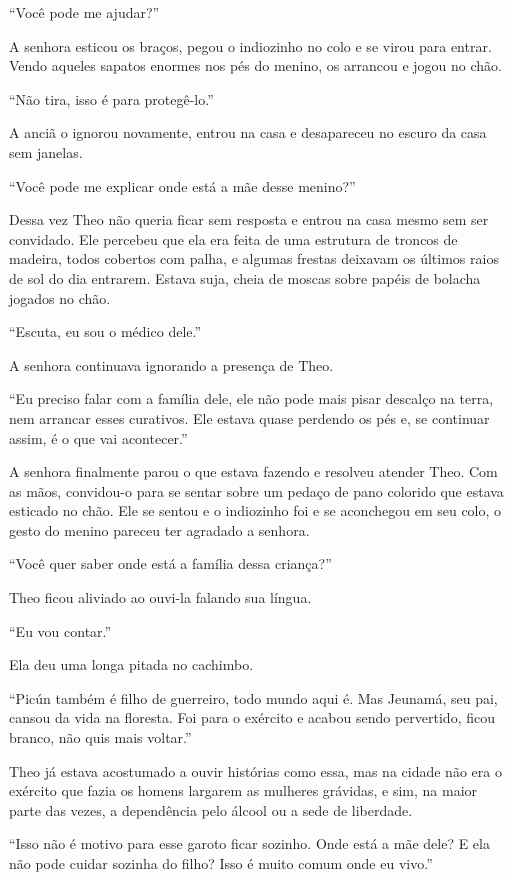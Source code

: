 ``Você pode me ajudar?''

A senhora esticou os braços, pegou o indiozinho no colo e se virou para
entrar. Vendo aqueles sapatos enormes nos pés do menino, os arrancou e
jogou no chão.

``Não tira, isso é para protegê-lo.''

A anciã o ignorou novamente, entrou na casa e desapareceu no escuro da
casa sem janelas.

``Você pode me explicar onde está a mãe desse menino?''

Dessa vez Theo não queria ficar sem resposta e entrou na casa mesmo sem
ser convidado. Ele percebeu que ela era feita de uma estrutura de
troncos de madeira, todos cobertos com palha, e algumas frestas deixavam
os últimos raios de sol do dia entrarem. Estava suja, cheia de moscas
sobre papéis de bolacha jogados no chão.

``Escuta, eu sou o médico dele.''

A senhora continuava ignorando a presença de Theo.

``Eu preciso falar com a família dele, ele não pode mais pisar descalço
na terra, nem arrancar esses curativos. Ele estava quase perdendo os pés
e, se continuar assim, é o que vai acontecer.''

A senhora finalmente parou o que estava fazendo e resolveu atender Theo.
Com as mãos, convidou-o para se sentar sobre um pedaço de pano colorido
que estava esticado no chão. Ele se sentou e o indiozinho foi e se
aconchegou em seu colo, o gesto do menino pareceu ter agradado a
senhora.

``Você quer saber onde está a família dessa criança?''

Theo ficou aliviado ao ouvi-la falando sua língua.

``Eu vou contar.''

Ela deu uma longa pitada no cachimbo.

``Picún também é filho de guerreiro, todo mundo aqui é. Mas Jeunamá, seu
pai, cansou da vida na floresta. Foi para o exército e acabou sendo
pervertido, ficou branco, não quis mais voltar.''

Theo já estava acostumado a ouvir histórias como essa, mas na cidade não
era o exército que fazia os homens largarem as mulheres grávidas, e sim,
na maior parte das vezes, a dependência pelo álcool ou a sede de
liberdade.

``Isso não é motivo para esse garoto ficar sozinho. Onde está a mãe
dele? E ela não pode cuidar sozinha do filho? Isso é muito comum onde eu
vivo.''

